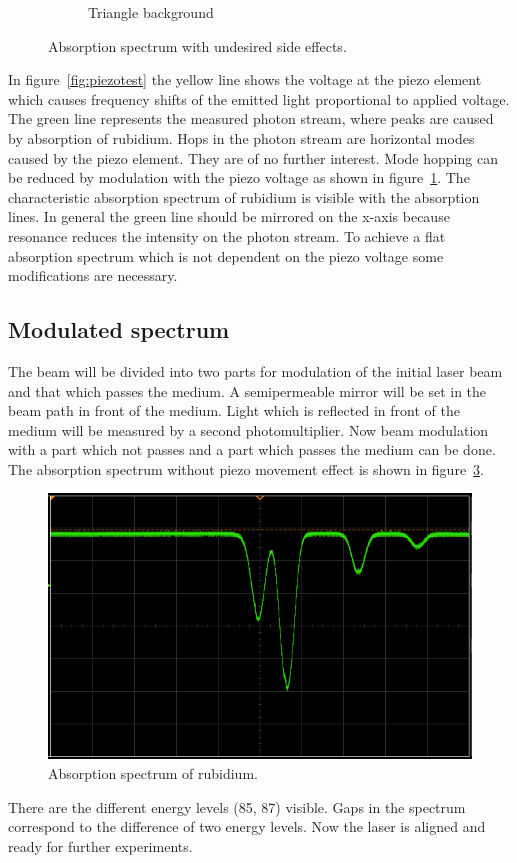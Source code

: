 \begin{figure}[h]
\begin{subfigure}[b]{0.49\textwidth}
\begin{center}
						\caption{Triangle background}%
						\label{fig:rectangular}
				\end{center}
		\end{subfigure}
		\caption{Absorption spectrum with undesired side effects.}%
		\label{fig:}
\end{figure}
In figure~\ref{fig:piezotest} the yellow line shows the voltage at the piezo
element which causes frequency shifts of the emitted light proportional to
applied voltage.
The green line represents the measured photon stream, where peaks are caused by
absorption of rubidium.
Hops in the photon stream are horizontal modes caused by the piezo element.
They are of no further interest.
Mode hopping can be reduced by modulation with the piezo voltage as shown in
figure~\ref{fig:rectangular}.
The characteristic absorption spectrum of rubidium is visible with the
absorption lines.
In general the green line should be mirrored on the x-axis because resonance
reduces the intensity on the photon stream.
To achieve a flat absorption spectrum which is not dependent on the piezo voltage some
modifications are necessary.

\subsection{Modulated spectrum}%
\label{sub:modulated_spectrum}

The beam will be divided into two parts
for modulation of the initial laser beam and that which passes the medium.
A semipermeable mirror will be set in the beam path in front of the medium.
Light which is reflected in front of the medium will be measured by a second photomultiplier.
Now beam modulation with a part which not passes and a part which passes the
medium can be done.
The absorption spectrum without piezo movement effect is shown in figure~\ref{fig:modulation}.
\begin{figure}[h]
		\centering
		\includegraphics[width=0.8\linewidth]{./content/pictures/scope_140.png}
		\caption{Absorption spectrum of rubidium.}%
		\label{fig:modulation}
\end{figure}
There are the different energy levels (85, 87) visible.
Gaps in the spectrum correspond to the difference of two energy levels.
Now the laser is aligned and ready for further experiments.
